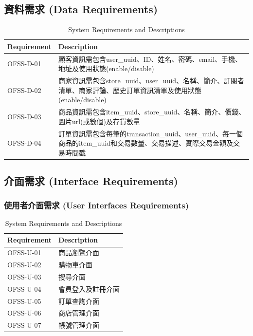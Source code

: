 \documentclass[a4paper, 12pt]{article}
\begin{document}
\subsection{資料需求 (Data Requirements)}
\begin{table}[h]
    \centering
    \renewcommand{\arraystretch}{1.35}
    \begin{tabular}{|p{3cm}|p{10cm}|}
        \hline
        \textbf{Requirement} & \textbf{Description} \\
        \hline
        OFSS-D-01 & 顧客資訊需包含user_uuid、ID、姓名、密碼、email、手機、地址及使用狀態(enable/disable) \\
        \hline
        OFSS-D-02 & 商家資訊需包含store_uuid、user_uuid、名稱、簡介、訂閱者清單、商家評論、歷史訂單資訊清單及使用狀態(enable/disable) \\
        \hline
        OFSS-D-03 & 商品資訊需包含item_uuid、store_uuid、名稱、簡介、價錢、圖片url(或數個)及存貨數量 \\
        \hline
        OFSS-D-04 & 訂單資訊需包含每筆的transaction_uuid、user_uuid、每一個商品的item_uuid和交易數量、交易描述、實際交易金額及交易時間戳 \\
        \hline
    \end{tabular}
    \caption{System Requirements and Descriptions}
    \label{tab:system-requirements}
\end{table}
\newpage
\subsection{介面需求 (Interface Requirements)}
\subsubsection{使用者介面需求 (User Interfaces Requirements)}
\begin{table}[h]
    \centering
    \renewcommand{\arraystretch}{1.35}
    \begin{tabular}{|p{3cm}|p{10cm}|}
        \hline
        \textbf{Requirement} & \textbf{Description} \\
        \hline
        OFSS-U-01 & 商品瀏覽介面 \\
        \hline
        OFSS-U-02 & 購物車介面 \\
        \hline
        OFSS-U-03 & 搜尋介面 \\
        \hline
        OFSS-U-04 & 會員登入及註冊介面 \\
        \hline
        OFSS-U-05 & 訂單查詢介面 \\
        \hline
        OFSS-U-06 & 商店管理介面 \\
        \hline
        OFSS-U-07 & 帳號管理介面 \\
        \hline
        
    \end{tabular}
    \caption{System Requirements and Descriptions}
    \label{tab:system-requirements}
\end{table}
\end{document}
